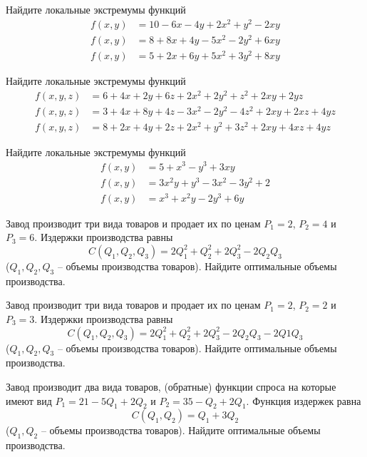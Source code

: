 
\begin{exercise}
Найдите локальные экстремумы функций
\begin{align*}
	f(x,y) &= 10-6x-4y+2x^2+y^2-2xy \\
	f(x,y) &= 8+8x+4y-5x^2-2y^2+6xy \\
	f(x,y) &= 5+2x+6y+5x^2+3y^2+8xy
\end{align*}
\end{exercise}

\begin{exercise}
Найдите локальные экстремумы функций
\begin{align*}
	f(x,y,z) &= 6+4x+2y+6z+2x^2+2y^2+z^2+2xy+2yz \\
	f(x,y,z) &= 3+4x+8y+4z-3x^2-2y^2-4z^2+2xy+2xz+4yz\\
	f(x,y,z) &= 8+2x+4y+2z+2x^2+y^2+3z^2+2xy+4xz+4yz
\end{align*}
\end{exercise}

\begin{exercise}
Найдите локальные экстремумы функций
\begin{align*}
	f(x,y) &= 5+x^3-y^3+3xy \\
	f(x,y) &= 3x^2y+y^3-3x^2-3y^2+2 \\
	f(x,y) &= x^3+x^2y-2y^3+6y
\end{align*}
\end{exercise}

\begin{exercise}
Завод производит три вида товаров и продает их по ценам $P_1=2$, $P_2=4$ и $P_3=6$.
Издержки производства равны
\[
	C(Q_1,Q_2,Q_3)=2Q_1^2+Q_2^2+2Q_3^2-2Q_2Q_3
\]
($Q_1, Q_2, Q_3$ -- объемы производства товаров). Найдите оптимальные объемы производства. 
\end{exercise}

\begin{exercise}
Завод производит три вида товаров и продает их по ценам $P_1=2$, $P_2=2$ и $P_3=3$.
Издержки производства равны 
\[
	C(Q_1,Q_2,Q_3)=2Q_1^2+Q_2^2+2Q_3^2-2Q_2Q_3-2Q1Q_3
\]
($Q_1, Q_2, Q_3$ -- объемы производства товаров).
Найдите оптимальные объемы производства.
\end{exercise}

\begin{exercise}
Завод производит два вида товаров, (обратные) функции спроса на которые
имеют вид $P_1=21-5Q_1+2Q_2$ и $P_2=35-Q_2+2Q_1$. Функция
издержек равна
\[
	C(Q_1,Q_2)=Q_1+3Q_2
\]
($Q_1, Q_2$ -- объемы производства товаров). Найдите оптимальные объемы производства. 
\end{exercise}

